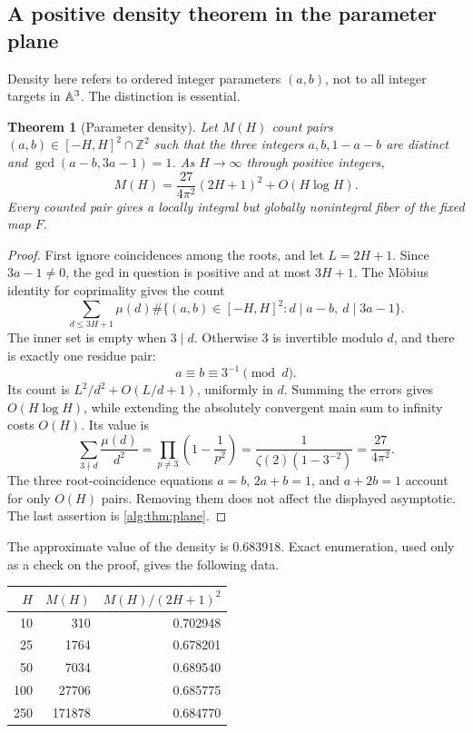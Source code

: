 \documentclass[11pt]{article}
\numberwithin{equation}{section}
\newtheorem{theorem}{Theorem}[section]
\theoremstyle{plain}
\theoremstyle{plain}
\theoremstyle{plain}
\theoremstyle{definition}
\theoremstyle{definition}
\theoremstyle{definition}
\theoremstyle{remark}
\newcommand{\Z}{\mathbb Z}\newcommand{\Q}{\mathbb Q}
\begin{document}
\subsection{A positive density theorem in the parameter plane}
Density here refers to ordered integer parameters $(a,b)$, not to all
integer targets in $\mathbb A^3$. The distinction is essential.

\begin{theorem}[Parameter density]\label{alg:thm:densityparams}
Let $M(H)$ count pairs $(a,b)\in[-H,H]^2\cap\Z^2$ such that the three
integers $a,b,1-a-b$ are distinct and
$\gcd(a-b,3a-1)=1$. As $H\to\infty$ through positive integers,
\begin{equation}\label{alg:eq:paramdensity}
 M(H)=\frac{27}{4\pi^2}(2H+1)^2+O(H\log H).
\end{equation}
Every counted pair gives a locally integral but globally nonintegral
fiber of the fixed map $F$.
\end{theorem}
\begin{proof}
First ignore coincidences among the roots, and let $L=2H+1$.
Since $3a-1\ne0$, the gcd in question is positive and at most $3H+1$.
The M\"obius identity for coprimality gives the count
\[
 \sum_{d\le3H+1}\mu(d)
 \#\{(a,b)\in[-H,H]^2:d\mid a-b,\ d\mid3a-1\}.
\]
The inner set is empty when $3\mid d$. Otherwise $3$ is invertible
modulo $d$, and there is exactly one residue pair:
\[
 a\equiv b\equiv3^{-1}\pmod d.
\]
Its count is $L^2/d^2+O(L/d+1)$, uniformly in $d$. Summing the errors gives
$O(H\log H)$, while extending the absolutely convergent main sum to
infinity costs $O(H)$. Its value is
\[
 \sum_{3\nmid d}\frac{\mu(d)}{d^2}
 =\prod_{p\ne3}\left(1-\frac1{p^2}\right)
 =\frac{1}{\zeta(2)(1-3^{-2})}
 =\frac{27}{4\pi^2}.
\]
The three root-coincidence equations
$a=b$, $2a+b=1$, and $a+2b=1$ account for only $O(H)$ pairs.
Removing them does not affect the displayed asymptotic. The last
assertion is \cref{alg:thm:plane}.
\end{proof}
The approximate value of the density is $0.683918$. Exact enumeration,
used only as a check on the proof, gives the following data.
\begin{center}
\begin{tabular}{r r r}
\toprule
$H$ & $M(H)$ & $M(H)/(2H+1)^2$\\
\midrule
10&310&0.702948\\
25&1764&0.678201\\
50&7034&0.689540\\
100&27706&0.685775\\
250&171878&0.684770\\
\bottomrule
\end{tabular}
\end{center}
\end{document}
